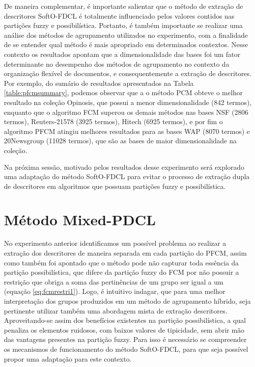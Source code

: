 De maneira complementar, é importante salientar que o método de extração de descritores SoftO-FDCL é
totalmente influenciado pelos valores contidos nas partições fuzzy e possibilística. Portanto, é
também importante se realizar uma análise dos métodos de agrupamento utilizados no experimento, com
a finalidade de se entender qual método é mais apropriado em determinados contextos. Nesse contexto
os resultados apontam que a dimensionalidade das bases foi um fator determinante no desempenho dos
métodos de agrupamento no contexto da organização flexível de documentos, e consequentemente a
extração de descritores. Por exemplo, do sumário de resultados apresentados na Tabela
\ref{table:pfcmsummary}, podemos observar que a o método PCM obteve o melhor resultado na coleção
Opinosis, que possui a menor dimensionalidade (842 termos), enquanto que o algoritmo FCM superou os
demais métodos nas bases NSF (2806 termos), Reuters-21578 (3925 termos), Hitech (6925 termos), e por
fim o algoritmo PFCM atingiu melhores resultados para as bases WAP (8070 termos) e 20Newsgroup
(11028 termos), que são as bases de maior dimensionalidade na coleção.

Na próxima sessão, motivado pelos resultados desse experimento será explorado uma adaptação do
método SoftO-FDCL para evitar o processo de extração dupla de descritores em algoritmos que possuam
partições fuzzy e possibilística.

\section{Método Mixed-PDCL}

No experimento anterior identificamos um possível problema ao realizar a extração dos
descritores de maneira separada em cada partição do PFCM, assim como também foi apontado que o
método pode não capturar toda essência da partição possibilística, que difere da partição fuzzy do
FCM por não possuir a restrição que obriga a soma das pertinências de um grupo ser igual a um
(equação \ref{eq:fcmrestri1}).
Logo, é intuitivo indagar, que para uma melhor interpretação dos grupos produzidos em um método de
agrupamento híbrido, seja pertinente utilizar também uma abordagem mista de extração descritores.
Aproveitando-se assim dos benefícios existentes na partição possibilística, a qual penaliza os
elementos ruidosos, com baixos valores de tipicidade, sem abrir mão das vantagens presentes na
partição fuzzy. Para isso é necessário se compreender os mecanismos de funcionamento do método
SoftO-FDCL, para que seja possível propor uma adaptação para este contexto.

